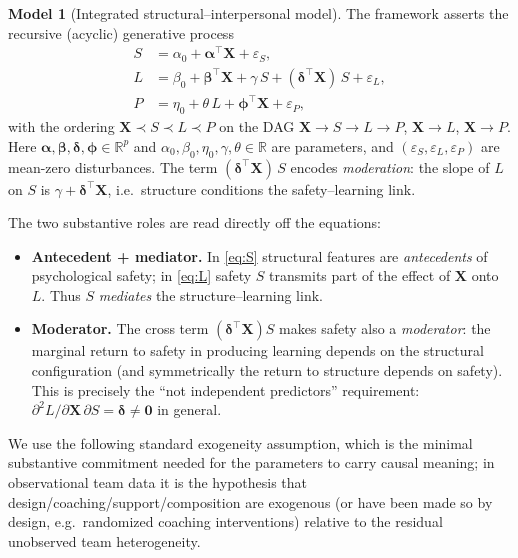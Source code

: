 \documentclass{amsart}
\theoremstyle{definition}
\newtheorem{model}{Model}
\theoremstyle{plain}
\begin{document}
\begin{model}[Integrated structural--interpersonal model]\label{mod:main}
The framework asserts the recursive (acyclic) generative process
\begin{align}
S &= \alpha_0 + \bm\alpha^\top \bm X + \varepsilon_S, \label{eq:S}\\
L &= \beta_0 + \bm\beta^\top \bm X + \gamma\, S
      + (\bm\delta^\top \bm X)\, S + \varepsilon_L, \label{eq:L}\\
P &= \eta_0 + \theta\, L + \bm\phi^\top \bm X + \varepsilon_P, \label{eq:P}
\end{align}
with the ordering $\bm X \prec S \prec L \prec P$ on the DAG $\bm X\to S\to L\to P$,
$\bm X\to L$, $\bm X\to P$. Here $\bm\alpha,\bm\beta,\bm\delta,\bm\phi\in\mathbb R^p$ and
$\alpha_0,\beta_0,\eta_0,\gamma,\theta\in\mathbb R$ are parameters, and
$(\varepsilon_S,\varepsilon_L,\varepsilon_P)$ are mean-zero disturbances.
The term $(\bm\delta^\top\bm X)\,S$ encodes \emph{moderation}: the slope of $L$ on $S$ is
$\gamma+\bm\delta^\top\bm X$, i.e.\ structure conditions the safety--learning link.
\end{model}

The two substantive roles are read directly off the equations:

\begin{itemize}
\item \textbf{Antecedent + mediator.} In \eqref{eq:S} structural features are
\emph{antecedents} of psychological safety; in \eqref{eq:L} safety $S$ transmits part of
the effect of $\bm X$ onto $L$. Thus $S$ \emph{mediates} the structure--learning link.
\item \textbf{Moderator.} The cross term $(\bm\delta^\top\bm X)S$ makes safety also a
\emph{moderator}: the marginal return to safety in producing learning depends on the
structural configuration (and symmetrically the return to structure depends on safety).
This is precisely the ``not independent predictors'' requirement: $\partial^2 L/\partial
\bm X\,\partial S=\bm\delta\neq\bm 0$ in general.
\end{itemize}

We use the following standard exogeneity assumption, which is the minimal substantive
commitment needed for the parameters to carry causal meaning; in observational team data it
is the hypothesis that design/coaching/support/composition are exogenous (or have been made
so by design, e.g.\ randomized coaching interventions) relative to the residual unobserved
team heterogeneity.
\end{document}
